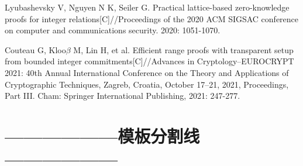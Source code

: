 \documentclass[zihao=-4]{ctexart}
\begin{document}
\begin{thebibliography}{2}
  Lyubashevsky V, Nguyen N K, Seiler G. Practical lattice-based zero-knowledge proofs for integer relations[C]//Proceedings of the 2020 ACM SIGSAC conference on computer and communications security. 2020: 1051-1070.

  Couteau G, Kloo$\beta$ M, Lin H, et al. Efficient range proofs with transparent setup from bounded integer commitments[C]//Advances in Cryptology–EUROCRYPT 2021: 40th Annual International Conference on the Theory and Applications of Cryptographic Techniques, Zagreb, Croatia, October 17–21, 2021, Proceedings, Part III. Cham: Springer International Publishing, 2021: 247-277.
	
	
\end{thebibliography}




\section{——————模板分割线——————}
\end{document}
